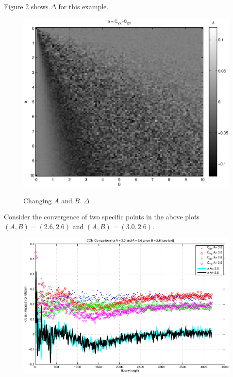 \documentclass{article}
\begin{document}
Figure \ref{fig2} shows $\Delta$ for this example.
\begin{center}
\begin{figure}[H]
\includegraphics[scale=0.7]{LinearEx_Delta.eps} \\
\caption{Changing $A$ and $B$. $\Delta$}
\label{fig2}
\end{figure}
\end{center}
Consider the convergence of two specific points in the above plots $(A,B) = (2.6,2.6)$ and $(A,B)=(3.0,2.6)$.
\begin{center}
\begin{figure}[H]
\includegraphics[scale=0.7]{LinearEx_ChangeL.eps} \\
\caption{}
\label{fig2}
\end{figure}
\end{center}
\end{document}
